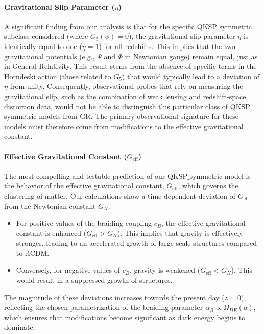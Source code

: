 \documentclass[twocolumn]{aastex631}
\begin{document}
\paragraph{Gravitational Slip Parameter ($\eta$)}
A significant finding from our analysis is that for the specific QKSP\ensuremath{\_}symmetric subclass considered (where $G_5(\phi)=0$), the gravitational slip parameter $\eta$ is identically equal to one ($\eta=1$) for all redshifts. This implies that the two gravitational potentials (e.g., $\Psi$ and $\Phi$ in Newtonian gauge) remain equal, just as in General Relativity. This result stems from the absence of specific terms in the Horndeski action (those related to $G_5$) that would typically lead to a deviation of $\eta$ from unity. Consequently, observational probes that rely on measuring the gravitational slip, such as the combination of weak lensing and redshift-space distortion data, would not be able to distinguish this particular class of QKSP\ensuremath{\_}symmetric models from GR. The primary observational signature for these models must therefore come from modifications to the effective gravitational constant.

\paragraph{Effective Gravitational Constant ($G_{\text{eff}}$)}
The most compelling and testable prediction of our QKSP\ensuremath{\_}symmetric model is the behavior of the effective gravitational constant, $G_{\text{eff}}$, which governs the clustering of matter. Our calculations show a time-dependent deviation of $G_{\text{eff}}$ from the Newtonian constant $G_N$.
\begin{itemize}
    \item For positive values of the braiding coupling $c_B$, the effective gravitational constant is enhanced ($G_{\text{eff}} > G_N$). This implies that gravity is effectively stronger, leading to an accelerated growth of large-scale structures compared to $\Lambda$CDM.
    \item Conversely, for negative values of $c_B$, gravity is weakened ($G_{\text{eff}} < G_N$). This would result in a suppressed growth of structures.
\end{itemize}
The magnitude of these deviations increases towards the present day ($z=0$), reflecting the chosen parametrization of the braiding parameter $\alpha_B \propto \Omega_{DE}(a)$, which ensures that modifications become significant as dark energy begins to dominate.
\end{document}
